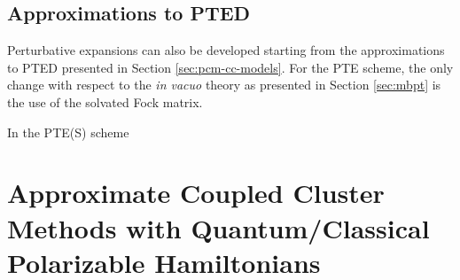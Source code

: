\subsection{Approximations to PTED}

Perturbative expansions can also be developed starting from the
approximations to \acrshort{PTED} presented in Section
\ref{sec:pcm-cc-models}.
For the \acrshort{PTE} scheme, the only change with respect to the
\emph{in vacuo} theory as presented in Section \ref{sec:mbpt} is the use
of the solvated Fock matrix.\autocite{Olivares_del_Valle1991-of,
Angyan1995-co, Lipparini2009-io}

In the \acrshort{PTE(S)} scheme


\section[Approximate Coupled Cluster Methods]{
Approximate Coupled Cluster Methods with Quantum/Classical Polarizable Hamiltonians
}\label{sec:cc-approximate-quantum-classical}

